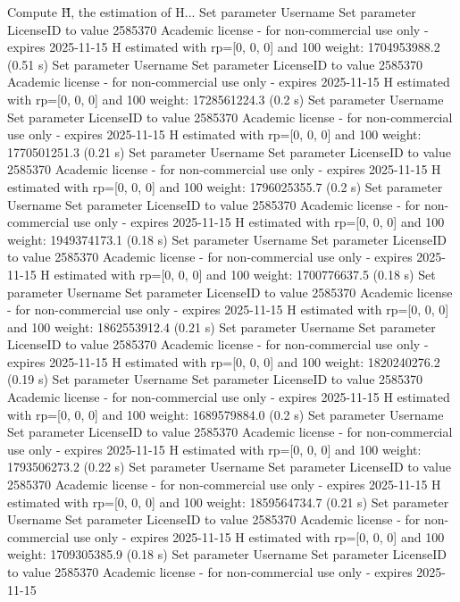 Compute H̃, the estimation of H...
Set parameter Username
Set parameter LicenseID to value 2585370
Academic license - for non-commercial use only - expires 2025-11-15
  H estimated with rp=[0, 0, 0] and 100 weight:  1704953988.2  (0.51 s)
Set parameter Username
Set parameter LicenseID to value 2585370
Academic license - for non-commercial use only - expires 2025-11-15
  H estimated with rp=[0, 0, 0] and 100 weight:  1728561224.3  (0.2 s)
Set parameter Username
Set parameter LicenseID to value 2585370
Academic license - for non-commercial use only - expires 2025-11-15
  H estimated with rp=[0, 0, 0] and 100 weight:  1770501251.3  (0.21 s)
Set parameter Username
Set parameter LicenseID to value 2585370
Academic license - for non-commercial use only - expires 2025-11-15
  H estimated with rp=[0, 0, 0] and 100 weight:  1796025355.7  (0.2 s)
Set parameter Username
Set parameter LicenseID to value 2585370
Academic license - for non-commercial use only - expires 2025-11-15
  H estimated with rp=[0, 0, 0] and 100 weight:  1949374173.1  (0.18 s)
Set parameter Username
Set parameter LicenseID to value 2585370
Academic license - for non-commercial use only - expires 2025-11-15
  H estimated with rp=[0, 0, 0] and 100 weight:  1700776637.5  (0.18 s)
Set parameter Username
Set parameter LicenseID to value 2585370
Academic license - for non-commercial use only - expires 2025-11-15
  H estimated with rp=[0, 0, 0] and 100 weight:  1862553912.4  (0.21 s)
Set parameter Username
Set parameter LicenseID to value 2585370
Academic license - for non-commercial use only - expires 2025-11-15
  H estimated with rp=[0, 0, 0] and 100 weight:  1820240276.2  (0.19 s)
Set parameter Username
Set parameter LicenseID to value 2585370
Academic license - for non-commercial use only - expires 2025-11-15
  H estimated with rp=[0, 0, 0] and 100 weight:  1689579884.0  (0.2 s)
Set parameter Username
Set parameter LicenseID to value 2585370
Academic license - for non-commercial use only - expires 2025-11-15
  H estimated with rp=[0, 0, 0] and 100 weight:  1793506273.2  (0.22 s)
Set parameter Username
Set parameter LicenseID to value 2585370
Academic license - for non-commercial use only - expires 2025-11-15
  H estimated with rp=[0, 0, 0] and 100 weight:  1859564734.7  (0.21 s)
Set parameter Username
Set parameter LicenseID to value 2585370
Academic license - for non-commercial use only - expires 2025-11-15
  H estimated with rp=[0, 0, 0] and 100 weight:  1709305385.9  (0.18 s)
Set parameter Username
Set parameter LicenseID to value 2585370
Academic license - for non-commercial use only - expires 2025-11-15
